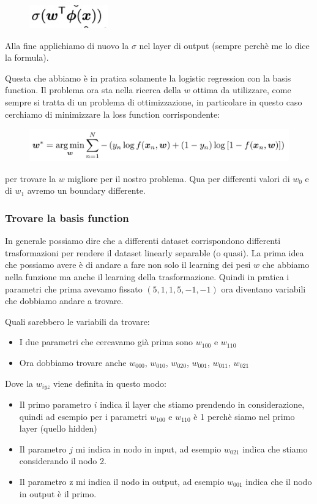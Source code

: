\documentclass[14pt]{extreport}
\begin{document}
\begin{figure}[H]
\centering
\includegraphics[width=0.3\linewidth]{364.jpeg}
\end{figure}

Alla fine applichiamo di nuovo la $\sigma$ nel layer di output (sempre perchè me lo dice la formula).

Questa che abbiamo è in pratica solamente la logistic regression con la basis function. Il problema ora sta nella ricerca della $w$ ottima da
utilizzare, come sempre si tratta di un problema di ottimizzazione, in particolare in questo caso cerchiamo di minimizzare la loss function
corrispondente:

\begin{figure}[H]
\centering
\includegraphics[width=0.7\linewidth]{363.jpeg}
\end{figure}

per trovare la $w$ migliore per il nostro problema. Qua per differenti valori di $w_0$ e di $w_1$ avremo un boundary differente.

\subsubsection{Trovare la basis function}

In generale possiamo dire che a differenti dataset corrispondono differenti trasformazioni per rendere il dataset linearly separable (o quasi). La
prima idea che possiamo avere è di andare a fare non solo il learning dei pesi $w$ che abbiamo nella funzione ma anche il learning della
trasformazione. Quindi in pratica i parametri che prima avevamo fissato $(5,1,1,5,-1,-1)$ ora diventano variabili che dobbiamo andare a trovare.

Quali sarebbero le variabili da trovare:
\begin{itemize}
\item I due parametri che cercavamo già prima sono $w_{100}$ e $w_{110}$ 
\item Ora dobbiamo trovare anche $w_{000}$, $w_{010}$, $w_{020}$, $w_{001}$, $w_{011}$, $w_{021}$
\end{itemize}

Dove la $w_{iyz}$ viene definita in questo modo:
\begin{itemize}
\item Il primo parametro $i$ indica il layer che stiamo prendendo in considerazione, quindi ad esempio per i parametri $w_{100}$ e $w_{110}$ è 1
perchè siamo nel primo layer (quello hidden)
\item Il parametro $j$ mi indica in nodo in input, ad esempio $w_{021}$ indica che stiamo considerando il nodo 2.
\item Il parametro z mi indica il nodo in output, ad esempio $w_{001}$ indica che il nodo in output è il primo. 
\end{itemize}
\end{document}
